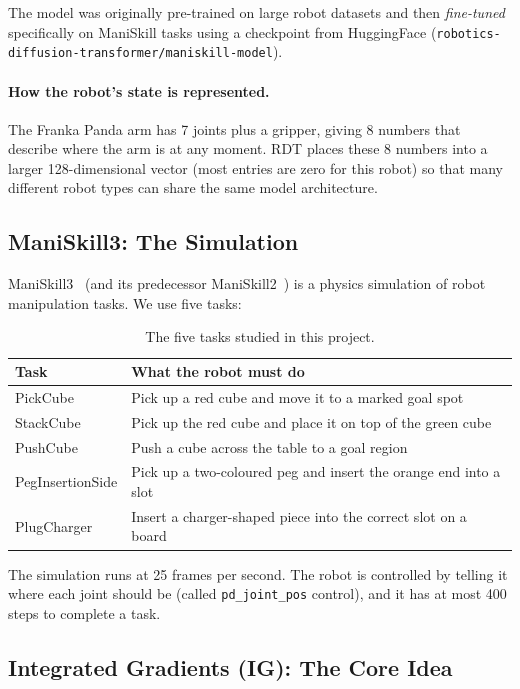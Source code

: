 \documentclass[11pt,a4paper]{article}
\begin{document}
The model was originally pre-trained on large robot datasets and then
\emph{fine-tuned} specifically on ManiSkill tasks using a checkpoint from
HuggingFace (\texttt{robotics-diffusion-transformer/maniskill-model}).

\paragraph{How the robot's state is represented.}
The Franka Panda arm has 7 joints plus a gripper, giving 8 numbers that describe
where the arm is at any moment. RDT places these 8 numbers into a larger
128-dimensional vector (most entries are zero for this robot) so that many
different robot types can share the same model architecture.

\subsection{ManiSkill3: The Simulation}

ManiSkill3~\cite{Chen2024ManiSkill3} (and its predecessor ManiSkill2~\cite{Gu2023ManiSkill2})
is a physics simulation of robot manipulation tasks. We use five tasks:

\begin{table}[h]
\centering
\caption{The five tasks studied in this project.}
\label{tab:tasks}
\begin{tabular}{ll}
\toprule
\textbf{Task} & \textbf{What the robot must do} \\
\midrule
PickCube         & Pick up a red cube and move it to a marked goal spot \\
StackCube        & Pick up the red cube and place it on top of the green cube \\
PushCube         & Push a cube across the table to a goal region \\
PegInsertionSide & Pick up a two-coloured peg and insert the orange end into a slot \\
PlugCharger      & Insert a charger-shaped piece into the correct slot on a board \\
\bottomrule
\end{tabular}
\end{table}

The simulation runs at 25 frames per second. The robot is controlled by
telling it where each joint should be (called \texttt{pd\_joint\_pos} control),
and it has at most 400 steps to complete a task.

\subsection{Integrated Gradients (IG): The Core Idea}
\end{document}
